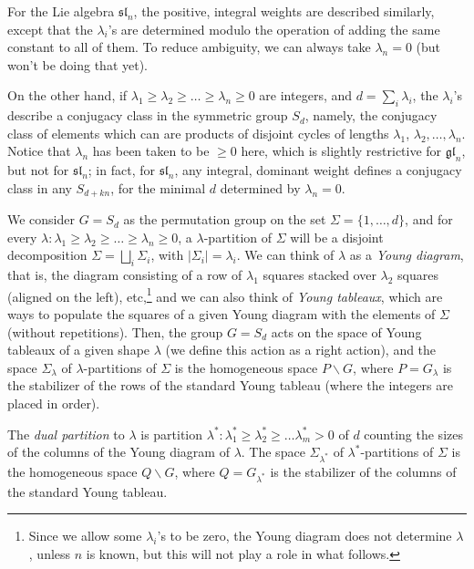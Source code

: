 For the Lie algebra $\mathfrak{sl}_n$, the positive, integral weights are described similarly, except that the $\lambda_i$'s are determined modulo the operation of adding the same constant to all of them. To reduce ambiguity, we can always take $\lambda_n=0$ (but won't be doing that yet).

On the other hand, if $\lambda_1\ge \lambda_2\ge \dots \ge \lambda_n \ge 0$ are integers, and $d=\sum_i \lambda_i$, the $\lambda_i$'s describe a conjugacy class in the symmetric group $S_d$, namely, the conjugacy class of elements which can are products of disjoint cycles of lengths $\lambda_1$, $\lambda_2, \dots, \lambda_n$. Notice that $\lambda_n$ has been taken to be $\ge 0$ here, which is slightly restrictive for $\mathfrak{gl}_n$, but not for $\mathfrak{sl}_n$; in fact, for $\mathfrak{sl}_n$, any integral, dominant weight defines a conjugacy class in any $S_{d+ kn}$, for the minimal $d$ determined by $\lambda_n=0$. 

We consider $G=S_d$ as the permutation group on the set $\Sigma = \{1,\dots, d\}$, and for every $\lambda:\lambda_1\ge \lambda_2\ge \dots \ge \lambda_n \ge 0$, a $\lambda$-partition of $\Sigma$ will be a disjoint decomposition $\Sigma = \bigsqcup_i \Sigma_i$, with $|\Sigma_i| = \lambda_i$. We can think of $\lambda$ as a \emph{Young diagram}, that is, the diagram consisting of a row of $\lambda_1$ squares stacked over $\lambda_2$ squares (aligned on the left), etc,\footnote{Since we allow some $\lambda_i$'s to be zero, the Young diagram does not determine $\lambda$, unless $n$ is known, but this will not play a role in what follows.} and we can also think of \emph{Young tableaux}, which are ways to populate the squares of a given Young diagram with the elements of $\Sigma$ (without repetitions). Then, the group $G=S_d$ acts on the space of Young tableaux of a given shape $\lambda$ (we define this action as a right action), and the space $\Sigma_\lambda$ of $\lambda$-partitions of $\Sigma$ is the homogeneous space $P\backslash G$, where $P=G_\lambda$ is the stabilizer of the rows of the standard Young tableau (where the integers are placed in order). 

The \emph{dual partition} to $\lambda$ is partition $\lambda^*:\lambda^*_1\ge \lambda^*_2 \ge \dots \lambda^*_m >0$ of $d$ counting the sizes of the columns of the Young diagram of $\lambda$. The space $\Sigma_{\lambda^*}$ of $\lambda^*$-partitions of $\Sigma$ is the homogeneous space $Q\backslash G$, where $Q=G_{\lambda^*}$ is the stabilizer of the columns of the standard Young tableau.

